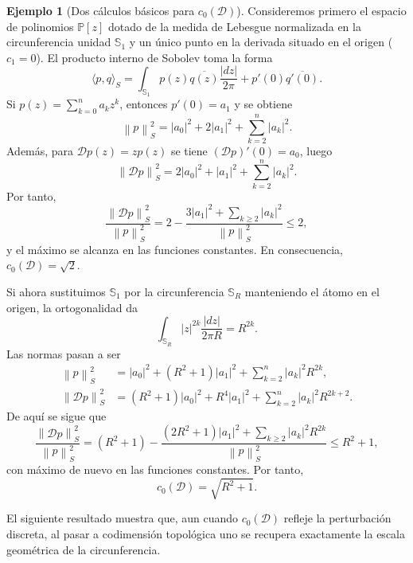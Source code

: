 \documentclass[12pt,a4paper]{article}
\theoremstyle{definition}
\newtheorem{example}{Ejemplo}
\theoremstyle{remark}
\newcommand{\Poly}{\mathbb{P}[z]}
\newcommand{\norm}[1]{\left\| #1 \right\|_S}
\newcommand{\abs}[1]{\left| #1 \right|}
\newcommand{\ip}[2]{\langle #1, #2 \rangle_S}
\newcommand{\D}{\mathcal{D}}
\begin{document}
\begin{example}[Dos cálculos básicos para $c_0(\D)$]
  Consideremos primero el espacio de polinomios $\Poly$ dotado de la medida de Lebesgue normalizada en la circunferencia unidad $\mathbb{S}_1$ y un único punto en la derivada situado en el origen ($c_1 = 0$). El producto interno de Sobolev toma la forma
  \begin{equation}
    \ip{p}{q} = \int_{\mathbb{S}_1} p(z)\overline{q(z)} \frac{\abs{dz}}{2\pi} + p'(0)\overline{q'(0)}.
  \end{equation}
  Si $p(z) = \sum_{k=0}^n a_k z^k$, entonces $p'(0) = a_1$ y se obtiene
  \begin{equation} \label{eq:norma_in_0}
    \norm{p}^2 = \abs{a_0}^2 + 2\abs{a_1}^2 + \sum_{k=2}^n \abs{a_k}^2.
  \end{equation}
  Además, para $\D p(z) = z p(z)$ se tiene $(\D p)'(0) = a_0$, luego
  \begin{equation} \label{eq:norma_out_0}
    \norm{\D p}^2 = 2\abs{a_0}^2 + \abs{a_1}^2 + \sum_{k=2}^n \abs{a_k}^2.
  \end{equation}
  Por tanto,
  \begin{equation}
    \frac{\norm{\D p}^2}{\norm{p}^2} = 2 - \frac{3\abs{a_1}^2 + \sum_{k \ge 2} \abs{a_k}^2}{\norm{p}^2} \le 2,
  \end{equation}
  y el máximo se alcanza en las funciones constantes. En consecuencia, $c_0(\D) = \sqrt{2}$.

  Si ahora sustituimos $\mathbb{S}_1$ por la circunferencia $\mathbb{S}_R$ manteniendo el átomo en el origen, la ortogonalidad da
  \[\int_{\mathbb{S}_R} |z|^{2k} \frac{|dz|}{2\pi R} = R^{2k}.\]
  Las normas pasan a ser
  \begin{align}
    \norm{p}^2    & = \abs{a_0}^2 + (R^2 + 1)\abs{a_1}^2 + \sum_{k=2}^n \abs{a_k}^2 R^{2k}, \label{eq:norma_in_0_R}       \\
    \norm{\D p}^2 & = (R^2 + 1)\abs{a_0}^2 + R^4\abs{a_1}^2 + \sum_{k=2}^n \abs{a_k}^2 R^{2k+2}. \label{eq:norma_out_0_R}
  \end{align}
  De aquí se sigue que
  \begin{equation}
    \frac{\norm{\D p}^2}{\norm{p}^2} = (R^2 + 1) - \frac{(2R^2 + 1)\abs{a_1}^2 + \sum_{k \ge 2} \abs{a_k}^2 R^{2k}}{\norm{p}^2} \le R^2 + 1,
  \end{equation}
  con máximo de nuevo en las funciones constantes. Por tanto,
  \[
    c_0(\D) = \sqrt{R^2 + 1}.
  \]
\end{example}

El siguiente resultado muestra que, aun cuando $c_0(\D)$ refleje la perturbación discreta, al pasar a codimensión topológica uno se recupera exactamente la escala geométrica de la circunferencia.
\end{document}

